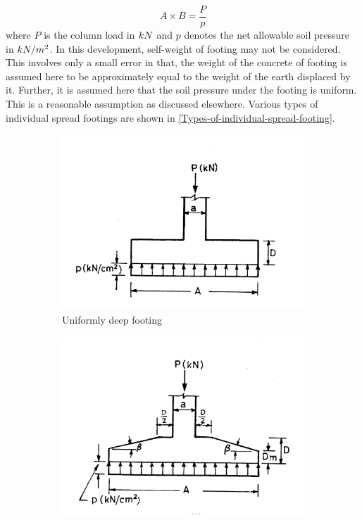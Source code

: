 \begin{equation}
\label{eq:footingArea}
A \times B = \frac{P}{p}
\end{equation}
where $P$ is the column load in $kN$ and $p$ denotes the net allowable
soil pressure in $kN/m^2$. In this development, self-weight of footing
may not be considered. This involves only a small error in that, the
weight of the concrete of footing is assumed here to be approximately
equal to the weight of the earth displaced by it. Further, it is assumed
here that the soil pressure under the footing is uniform. This is a 
reasonable assumption as discussed elsewhere. Various types of 
individual spread footings are shown in
\fig \ref{Types-of-individual-spread-footing}.
\begin{figure}
\begin{subfigure}[b]{0.5\textwidth}
  \includegraphics[width=\textwidth]{images/fig2291.png}
    \caption{Uniformly deep footing}
    \label{uniformdeepfooting}
  \end{subfigure}
  \begin{subfigure}[b]{0.5\textwidth}
    \includegraphics[width=\textwidth]{images/fig2292.png}

\end{subfigure}
\end{figure}
